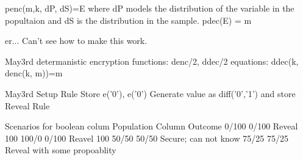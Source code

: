 \documentclass[journal]{IEEEtran}
\begin{document}
penc(m,k, dP, dS)=E
where dP models the distribution of the variable in the popultaion and dS is the distribution in the sample.
pdec(E) = m

er... Can't see how to make this work.

May3rd 
determanistic encryption
functions:
denc/2, ddec/2
equations:
ddec(k, denc(k, m))=m

May3rd
Setup Rule
Store e('0'), e('0')
Generate value as diff('0','1') and store
Reveal Rule

Scenarios for boolean colum
Population 	Column 	Outcome
0/100		0/100	Reveal 100%
100/0		0/100	Reavel 100%
50/50		50/50	Secure; can not know
75/25		75/25	Reveal with some propoablity





\end{document}
